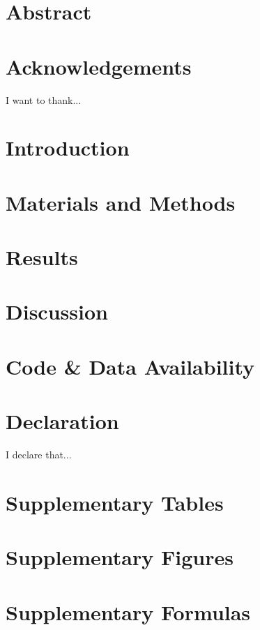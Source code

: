 \documentclass[12pt, oneside]{report}
\begin{document}


\chapter*{Abstract}


\chapter*{Acknowledgements}
I want to thank...

\tableofcontents
\listoffigures
\listoftables
\chapter{Introduction}
\label{chapter01}


\chapter{Materials and Methods}
\label{chapter02}


\chapter{Results}
\label{chapter03}


\chapter{Discussion}
\label{discussion}


\chapter*{Code \& Data Availability}

\chapter*{Declaration}
I declare that...

\appendix
\chapter{Supplementary Tables}

\chapter{Supplementary Figures}

\chapter{Supplementary Formulas}

\printbibliography
\end{document}
